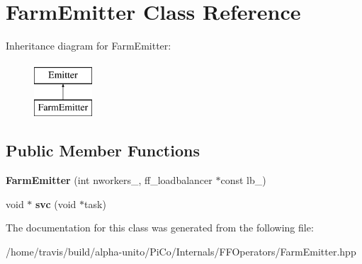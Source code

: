 \hypertarget{class_farm_emitter}{\section{\-Farm\-Emitter \-Class \-Reference}
\label{class_farm_emitter}
}
\-Inheritance diagram for \-Farm\-Emitter\-:\begin{figure}[H]
\begin{center}
\leavevmode
\includegraphics[height=2.000000cm]{class_farm_emitter}
\end{center}
\end{figure}
\subsection*{\-Public \-Member \-Functions}
\begin{DoxyCompactItemize}
\item 
\hypertarget{class_farm_emitter_a01025be243a01e5d97859c4e3da6c16c}{{\bfseries \-Farm\-Emitter} (int nworkers\-\_\-, ff\-\_\-loadbalancer $\ast$const lb\-\_\-)}\label{class_farm_emitter_a01025be243a01e5d97859c4e3da6c16c}

\item 
\hypertarget{class_farm_emitter_ad5da1f00cda5e224fe32c7a39aaf39e1}{void $\ast$ {\bfseries svc} (void $\ast$task)}\label{class_farm_emitter_ad5da1f00cda5e224fe32c7a39aaf39e1}

\end{DoxyCompactItemize}


\-The documentation for this class was generated from the following file\-:\begin{DoxyCompactItemize}
\item 
/home/travis/build/alpha-\/unito/\-Pi\-Co/\-Internals/\-F\-F\-Operators/\-Farm\-Emitter.\-hpp\end{DoxyCompactItemize}
